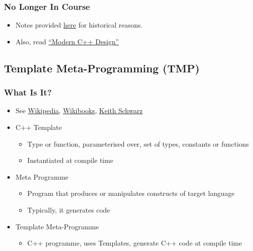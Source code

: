 \subsubsection{No Longer In Course}\label{no-longer-in-course}

\begin{itemize}
\itemsep1pt\parskip0pt
\item
  Notes provided \href{sec01TemplateMeta}{here} for historical reasons.
\item
  Also, read
  \href{http://erdani.com/index.php/books/modern-c-design/}{``Modern C++
  Design''}
\end{itemize}

\subsection{Template Meta-Programming
(TMP)}\label{template-meta-programming-tmp}

\subsubsection{What Is It?}\label{what-is-it-1}

\begin{itemize}
\itemsep1pt\parskip0pt
\item
  See
  \href{http://en.wikipedia.org/wiki/Template_metaprogramming}{Wikipedia},
  \href{http://en.wikibooks.org/wiki/C\%2B\%2B_Programming/Templates/Template_Meta-Programming}{Wikibooks},
  \href{http://www.keithschwarz.com/talks/slides/tmp-cs242.pdf}{Keith
  Schwarz}
\item
  C++ Template

  \begin{itemize}
  \itemsep1pt\parskip0pt
  \item
    Type or function, parameterised over, set of types, constants or
    functions
  \item
    Instantiated at compile time
  \end{itemize}
\item
  Meta Programme

  \begin{itemize}
  \itemsep1pt\parskip0pt
  \item
    Program that produces or manipulates constructs of target language
  \item
    Typically, it generates code
  \end{itemize}
\item
  Template Meta-Programme

  \begin{itemize}
  \itemsep1pt\parskip0pt
  \item
    C++ programme, uses Templates, generate C++ code at compile time
  \end{itemize}
\end{itemize}

